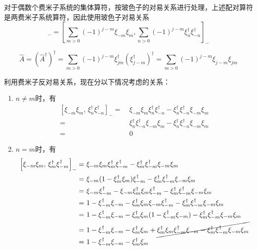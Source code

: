 对于偶数个费米子系统的集体算符，按玻色子的对易关系进行处理，上述配对算符是两费米子系统算符，因此使用玻色子对易关系
\begin{equation}
    [\hat{A}, \hat{A}^{\dagger}]_{-} = \left[\sum_{m > 0}(-1)^{j - m}\xi_{-m} \xi_{m}, \sum_{n > 0} (-1)^{j - m} \xi_{n}^{\dagger} \xi_{-n}^{\dagger}\right]_{-}
    \label{eq:fermi-pair-comm}
\end{equation}
\begin{note}
    \begin{equation*}
        \hat{A} = (\hat{A}^{\dagger})^{\dagger} = \sum_{m > 0} (-1)^{j - m} \xi_{jm}^{\dagger} (\xi_{j-m}^{\dagger})^{\dagger}
        = \sum_{m > 0} (-1)^{j - m} \xi_{j-m} \xi_{jm}
    \end{equation*}
\end{note}
利用费米子反对易关系，现在分以下情况考虑的关系：
\begin{enumerate}
    \item $n \neq m$时，有
        \begin{align*}
            \left[\xi_{-m} \xi_{m},\, \xi_{n}^{\dagger} \xi_{-n}^{\dagger}\right]_{-}
            =&\  \xi_{-m} \xi_{m} \xi_{n}^{\dagger} \xi_{-n}^{\dagger}
            - \xi_{n}^{\dagger} \xi_{-n}^{\dagger} \xi_{-m} \xi_{m}  \\
            =&\ \xi_{n}^{\dagger} \xi_{-n}^{\dagger} \xi_{-m} \xi_{m} 
            - \xi_{n}^{\dagger} \xi_{-n}^{\dagger} \xi_{-m} \xi_{m}  \\
            =&\ 0
        \end{align*}
    \item $n = m$时，有
        \begin{align*}
            \left[\xi_{-m} \xi_{m},\, \xi_{m}^{\dagger} \xi_{-m}^{\dagger}\right]_{-}
            =&\  \xi_{-m} \xi_{m} \xi_{m}^{\dagger} \xi_{-m}^{\dagger}
              - \xi_{m}^{\dagger} \xi_{-m}^{\dagger} \xi_{-m} \xi_{m}  \\
            =&\  \xi_{-m} (1 - \xi_{m}^{\dagger} \xi_{m}) \xi_{-m}^{\dagger}
              - \xi_{m}^{\dagger} \xi_{-m}^{\dagger} \xi_{-m} \xi_{m} \\
            =&\  \xi_{-m}\xi_{-m}^{\dagger} - \xi_{-m}\xi_{m}^{\dagger} \xi_{m} \xi_{-m}^{\dagger}
              - \xi_{m}^{\dagger} \xi_{-m}^{\dagger} \xi_{-m} \xi_{m} \\
            =&\  1 - \xi_{-m}^{\dagger}\xi_{-m} - \xi_{m}^{\dagger} \xi_{m} \xi_{-m} \xi_{-m}^{\dagger}
              - \xi_{m}^{\dagger} \xi_{-m}^{\dagger} \xi_{-m} \xi_{m} \\
            =&\  1 - \xi_{-m}^{\dagger}\xi_{-m} - \xi_{m}^{\dagger} \xi_{m} (1 - \xi_{-m}^{\dagger}\xi_{-m})
              - \xi_{m}^{\dagger} \xi_{-m}^{\dagger} \xi_{-m} \xi_{m} \\
            =&\  1 - \xi_{-m}^{\dagger}\xi_{-m} - \xi_{m}^{\dagger} \xi_{m} + \cancel{\xi_{m}^{\dagger} \xi_{m}\xi_{-m}^{\dagger}\xi_{-m}
              - \xi_{m}^{\dagger} \xi_{-m}^{\dagger} \xi_{-m} \xi_{m} } \\ 
            =&\  1 - \xi_{-m}^{\dagger}\xi_{-m} - \xi_{m}^{\dagger} \xi_{m}
        \end{align*}
\end{enumerate}
